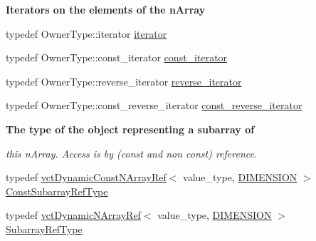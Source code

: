\begin{Indent}{\bf Iterators on the elements of the n\+Array}\par
\begin{DoxyCompactItemize}
\item 
typedef Owner\+Type\+::iterator \hyperlink{classvct_dynamic_const_n_array_base_a0d7eee16dd05c2f5757640b3617cac5d}{iterator}
\item 
typedef Owner\+Type\+::const\+\_\+iterator \hyperlink{classvct_dynamic_const_n_array_base_a026881a1dc4be02626681c9c3056395b}{const\+\_\+iterator}
\item 
typedef Owner\+Type\+::reverse\+\_\+iterator \hyperlink{classvct_dynamic_const_n_array_base_a028c350d6f74e002681cce4239dfdbc1}{reverse\+\_\+iterator}
\item 
typedef Owner\+Type\+::const\+\_\+reverse\+\_\+iterator \hyperlink{classvct_dynamic_const_n_array_base_a133cecf87f369296ad391ce3b697466b}{const\+\_\+reverse\+\_\+iterator}
\end{DoxyCompactItemize}
\end{Indent}
\begin{Indent}{\bf The type of the object representing a subarray of}\par
{\em this n\+Array. Access is by (const and non const) reference. }\begin{DoxyCompactItemize}
\item 
typedef \hyperlink{classvct_dynamic_const_n_array_ref}{vct\+Dynamic\+Const\+N\+Array\+Ref}$<$ value\+\_\+type, \hyperlink{classvct_dynamic_const_n_array_base_a815ac316ebc1bb2ab1969d307549826faf759c9ab831ff929b89af4ea2865a378}{D\+I\+M\+E\+N\+S\+I\+O\+N} $>$ \hyperlink{classvct_dynamic_const_n_array_base_a4b3508630e409eda4f0d2f55d17d89a4}{Const\+Subarray\+Ref\+Type}
\item 
typedef \hyperlink{classvct_dynamic_n_array_ref}{vct\+Dynamic\+N\+Array\+Ref}$<$ value\+\_\+type, \hyperlink{classvct_dynamic_const_n_array_base_a815ac316ebc1bb2ab1969d307549826faf759c9ab831ff929b89af4ea2865a378}{D\+I\+M\+E\+N\+S\+I\+O\+N} $>$ \hyperlink{classvct_dynamic_const_n_array_base_a4db8630795191b1854a5af85b9327ee3}{Subarray\+Ref\+Type}
\end{DoxyCompactItemize}
\end{Indent}

